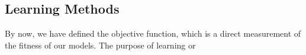\subsection {Learning Methods}
By now, we have defined the objective function, which is a direct measurement of the fitness of our models. The purpose of learning or